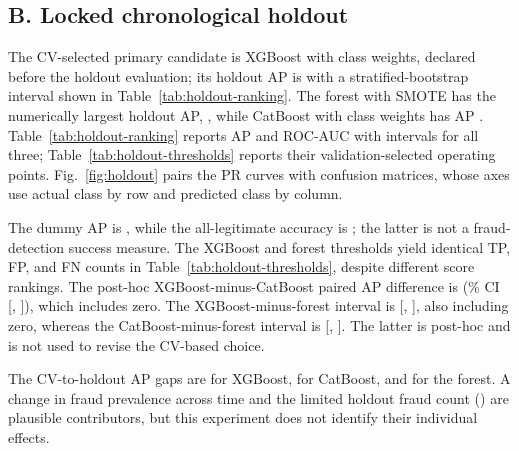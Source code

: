 \documentclass[journal]{IEEEtran}
\begin{document}
\subsection{B. Locked chronological holdout}
The CV-selected primary candidate is XGBoost with class weights, declared before the holdout evaluation; its holdout AP is \XgbWeightsAP{} with a stratified-bootstrap interval shown in Table~\ref{tab:holdout-ranking}. The forest with SMOTE has the numerically largest holdout AP, \RfSmoteAP{}, while CatBoost with class weights has AP \CatboostWeightsAP{}. Table~\ref{tab:holdout-ranking} reports AP and ROC-AUC with intervals for all three; Table~\ref{tab:holdout-thresholds} reports their validation-selected operating points. Fig.~\ref{fig:holdout} pairs the PR curves with confusion matrices, whose axes use actual class by row and predicted class by column.

The dummy AP is \DummyAP{}, while the all-legitimate accuracy is \AllLegitAccuracy{}; the latter is not a fraud-detection success measure. The XGBoost and forest thresholds yield identical TP, FP, and FN counts in Table~\ref{tab:holdout-thresholds}, despite different score rankings. The post-hoc XGBoost-minus-CatBoost paired AP difference is \TopCVPairDifference{} (\ConfidenceLevel{}\% CI [\TopCVPairLow{}, \TopCVPairHigh{}]), which includes zero. The XGBoost-minus-forest interval is [\XGBRFPairLow{}, \XGBRFPairHigh{}], also including zero, whereas the CatBoost-minus-forest interval is [\CatRFPairLow{}, \CatRFPairHigh{}]. The latter is post-hoc and is not used to revise the CV-based choice.

The CV-to-holdout AP gaps are \XgbWeightsCVToHoldoutAPDrop{} for XGBoost, \CatboostWeightsCVToHoldoutAPDrop{} for CatBoost, and \RfSmoteCVToHoldoutAPDrop{} for the forest. A change in fraud prevalence across time and the limited holdout fraud count (\TestFraudCount{}) are plausible contributors, but this experiment does not identify their individual effects.

\begin{table}[!t]
\centering
\caption{Locked chronological holdout ranking metrics with stratified-bootstrap \ConfidenceLevel{}\% confidence intervals.}
\label{tab:holdout-ranking}

\end{table}

\begin{table}[!t]
\centering
\caption{Holdout threshold metrics at thresholds selected on validation data; counts are true positives, false positives, and false negatives.}
\label{tab:holdout-thresholds}

\end{table}
\end{document}
